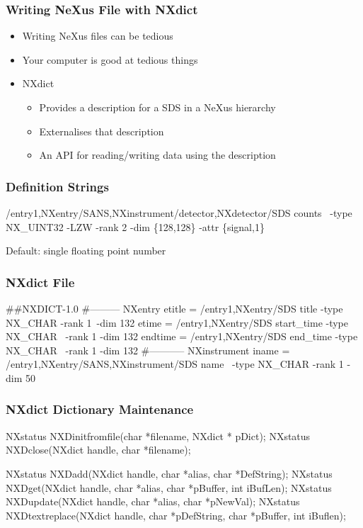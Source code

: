 \documentclass{beamer}
\begin{document}
\begin{frame} \frametitle{Writing NeXus File with NXdict}
\begin{itemize}
\item<1->Writing NeXus files can be tedious
\item<2->Your computer is good at tedious things
\item<3->NXdict
\begin{itemize}
\item<4->Provides a description for a SDS in a NeXus hierarchy
\item<5->Externalises that description
\item<6->An API for reading/writing data using the description
\end{itemize}
\end{itemize}
\end{frame}

\begin{frame} \frametitle{Definition Strings}
/entry1,NXentry/SANS,NXinstrument/detector,NXdetector/SDS counts \
       -type NX\_UINT32 -LZW -rank 2 -dim \{128,128\}  -attr \{signal,1\}
\vspace{1.5cm}

Default: single floating point number

\end{frame}

\begin{frame}[fragile]
\frametitle{NXdict File}
\begin{semiverbatim}
##NXDICT-1.0
#--------- NXentry
etitle = /entry1,NXentry/SDS title -type NX_CHAR -rank 1\
  -dim {132}
etime = /entry1,NXentry/SDS start_time -type NX_CHAR \
 -rank 1 -dim {132}
endtime = /entry1,NXentry/SDS end_time -type NX_CHAR \
 -rank 1 -dim {132}
#----------- NXinstrument
iname = /entry1,NXentry/SANS,NXinstrument/SDS  name \
 -type NX_CHAR -rank 1 -dim {50}

\end{semiverbatim}
\end{frame}


\begin{frame}[fragile]
\frametitle{NXdict Dictionary Maintenance}
\begin{semiverbatim}
NXstatus NXDinitfromfile(char *filename, NXdict * pDict);
NXstatus NXDclose(NXdict handle, char *filename);

NXstatus NXDadd(NXdict handle, char *alias, 
                char *DefString);
NXstatus NXDget(NXdict handle, char *alias, 
                char *pBuffer, int iBufLen);
NXstatus NXDupdate(NXdict handle, 
                   char *alias, char *pNewVal);
NXstatus NXDtextreplace(NXdict handle, char *pDefString, 
                        char *pBuffer, int iBuflen);
\end{semiverbatim}
\end{frame}
\end{document}
